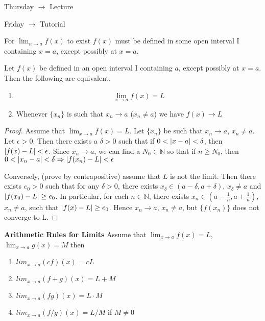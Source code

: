 Thursday $\to$ Lecture

Friday $\to$ Tutorial

For $\lim_{n\to a}f(x)$ to exist $f(x)$ must be defined in some open interval I containing $x=a$, except possibly at $x=a$.

\begin{thm}
Let $f(x)$ be defined in an open interval I containing $a$, except possibly at $x=a$. Then the following are equivalent.
\begin{enumerate}
\item \[\lim_{x\to a} f(x) = L\]
\item Whenever $\{x_n\}$ is such that $x_n\to a$ ($x_n\neq a$) we have $f(x)\to L$
\end{enumerate}
\end{thm}

\begin{proof}
Assume that $\lim_{x\to a}f(x) = L$. Let $\{x_n\}$ be such that $x_n\to a$, $x_n \neq a$. Let $\epsilon > 0$. Then there exists a $\delta >0$ such that if $0<\left| x-a \right|<\delta$, then $\left| f(x) - L \right| < \epsilon$. Since $x_n\to a$, we can find a $N_0\in \mathbb{N}$ so that if $n\geq N_0$, then $0<\left| x_n-a \right|<\delta \Rightarrow \left| f(x_n) - L \right|<\epsilon$

Conversely, (prove by contrapositive) assume that $L$ is not the limit. Then there exists $e_0 > 0$ such that for any $\delta > 0$, there exists $x_\delta \in (a-\delta,a+\delta)$, $x_\delta \neq a$ and $\left| f(x_\delta) - L \right| \geq e_0$. In particular, for each $n\in\mathbb{N}$, there exists $x_n\in (a-\frac{1}{n},a+\frac{1}{n})$, $x_n \neq a$, such that $\left| f(x) - L \right| \geq e_0$. Hence $x_n \to a$, $x_n\neq a$, but $\{f(x_n)\}$ does not converge to L.
\end{proof}

\begin{thm}\textbf{Arithmetic Rules for Limits}
Assume that $\lim_{x\to a} f(x) = L$, $\lim_{x\to a} g(x) = M$ then 
\begin{enumerate}
\item $lim_{x\to a} (cf)(x) = cL$
\item $lim_{x\to a} (f+g)(x) = L+M$
\item $lim_{x\to a} (fg)(x) = L\cdot M$
\item $lim_{x\to a} (f/g)(x) = L/M$ if $M\neq 0$
\end{enumerate}
\end{thm}

